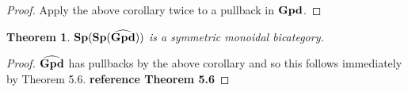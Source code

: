\documentclass[11pt]{amsart}
\newtheorem{thm}{Theorem}[section]
\theoremstyle{remark}
\theoremstyle{definition}
\begin{document}
\begin{proof}
Apply the above corollary twice to a pullback in $\bold{Gpd}$.
\end{proof}
\begin{thm}
$\bold{Sp(Sp(\widehat{Gpd}))}$ is a symmetric monoidal bicategory.
\end{thm}
\begin{proof}
$\bold{\widehat{Gpd}}$ has pullbacks by the above corollary and so this follows immediately by Theorem 5.6. \textbf{reference Theorem 5.6}
\end{proof}

%
%
\end{document}
